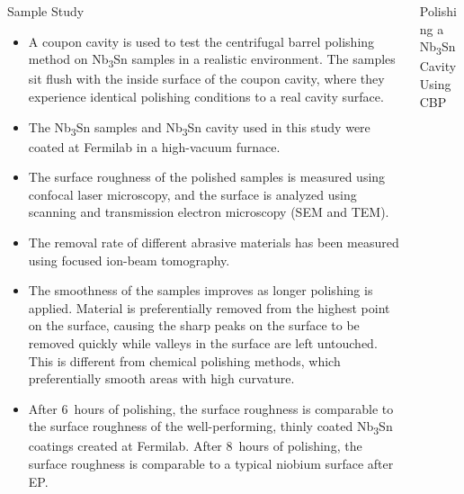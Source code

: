\documentclass{beamer}
\begin{document}
\begin{frame}{}
\begin{columns}[t]
\begin{column}{0.32\linewidth}
\begin{block}{\label{sec:samplestudy}Sample Study}
                    \begin{itemize}                        
                        \item A coupon cavity is used to test the centrifugal barrel polishing method on Nb\textsubscript{3}Sn samples in a realistic environment. The samples sit flush with the inside surface of the coupon cavity, where they experience identical polishing conditions to a real cavity surface.
                        \item The Nb\textsubscript{3}Sn samples and Nb\textsubscript{3}Sn cavity used in this study were coated at Fermilab in a high-vacuum furnace.
                        \item The surface roughness of the polished samples is measured using confocal laser microscopy, and the surface is analyzed using scanning and transmission electron microscopy (SEM and TEM). 
                        \item The removal rate of different abrasive materials has been measured using focused ion-beam tomography.
                        \item The smoothness of the samples improves as longer polishing is applied. Material is preferentially removed from the highest point on the surface, causing the sharp peaks on the surface to be removed quickly while valleys in the surface are left untouched. This is different from chemical polishing methods, which preferentially smooth areas with high curvature.
                        \item After 6~hours of polishing, the surface roughness is comparable to the surface roughness of the well-performing, thinly coated Nb\textsubscript{3}Sn coatings created at Fermilab. After 8~hours of polishing, the surface roughness is comparable to a typical niobium surface after EP.
                    \end{itemize}
                \end{block}
            \end{column}
            \begin{column}{0.32\textwidth}
                \begin{block}{\label{sec:cavitycbp}Polishing a Nb\textsubscript{3}Sn Cavity Using CBP}
                    \begin{columns}
                        \begin{column}{0.45\columnwidth}
                            \begin{figure}[t]
                                \centering

\end{figure}
\end{column}
\end{columns}
\end{block}
\end{column}
\end{columns}
\end{frame}
\end{document}

